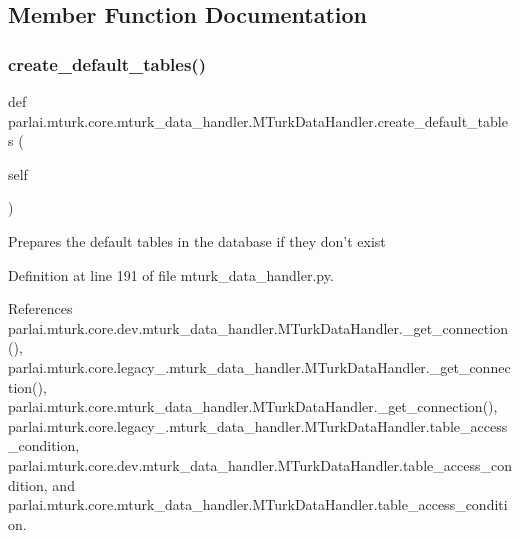 \subsection{Member Function Documentation}
\mbox{\label{classparlai_1_1mturk_1_1core_1_1mturk__data__handler_1_1MTurkDataHandler_a8427973bbee0e94309a60848f155206f}} 
\subsubsection{\texorpdfstring{create\+\_\+default\+\_\+tables()}{create\_default\_tables()}}
{\footnotesize\ttfamily def parlai.\+mturk.\+core.\+mturk\+\_\+data\+\_\+handler.\+M\+Turk\+Data\+Handler.\+create\+\_\+default\+\_\+tables (\begin{DoxyParamCaption}\item[{}]{self }\end{DoxyParamCaption})}

\begin{DoxyVerb}Prepares the default tables in the database if they don't exist\end{DoxyVerb}
 

Definition at line 191 of file mturk\+\_\+data\+\_\+handler.\+py.



References parlai.\+mturk.\+core.\+dev.\+mturk\+\_\+data\+\_\+handler.\+M\+Turk\+Data\+Handler.\+\_\+get\+\_\+connection(), parlai.\+mturk.\+core.\+legacy\+\_.\+mturk\+\_\+data\+\_\+handler.\+M\+Turk\+Data\+Handler.\+\_\+get\+\_\+connection(), parlai.\+mturk.\+core.\+mturk\+\_\+data\+\_\+handler.\+M\+Turk\+Data\+Handler.\+\_\+get\+\_\+connection(), parlai.\+mturk.\+core.\+legacy\+\_.\+mturk\+\_\+data\+\_\+handler.\+M\+Turk\+Data\+Handler.\+table\+\_\+access\+\_\+condition, parlai.\+mturk.\+core.\+dev.\+mturk\+\_\+data\+\_\+handler.\+M\+Turk\+Data\+Handler.\+table\+\_\+access\+\_\+condition, and parlai.\+mturk.\+core.\+mturk\+\_\+data\+\_\+handler.\+M\+Turk\+Data\+Handler.\+table\+\_\+access\+\_\+condition.

